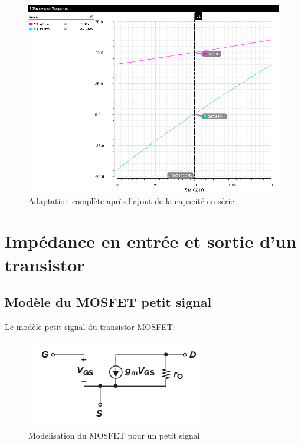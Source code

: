 \documentclass[a4paper]{article}
\begin{document}
\begin{figure}[!htb]
\begin{center}
  \includegraphics[scale=0.52]{Z11-2nd-adaptation.png}
  \caption{Adaptation compl\`ete apr\`es l'ajout de la capacit\'e en s\'erie}
\end{center}
\end{figure}

\clearpage

\section{Imp\'edance en entr\'ee et sortie d'un transistor}
\subsection{Mod\`ele du MOSFET petit signal}
Le mod\`ele petit signal du transistor MOSFET:

\begin{figure}[!htb]
\begin{center}
  \includegraphics[scale=0.7]{MOS_small_signal.png}
  \caption{Mod\'elisation du MOSFET pour un petit signal\cite{Analog-CMOS-microelectronics} }
\end{center}
\end{figure}
\end{document}
